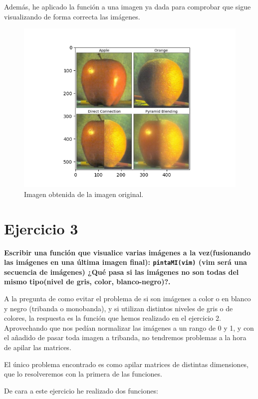 \documentclass[12pt, spanish]{article}
\begin{document}
Además, he aplicado la función a una imagen ya dada para comprobar que sigue visualizando de forma correcta las imágenes.

\begin{figure}[H]
	\centering
	\includegraphics[scale = 0.70]{ej2-orig.png}
	\caption{Imagen obtenida de la imagen original.}
	\label{fig:ej2-tri}
	
\end{figure}

\section{Ejercicio 3}

\textbf{\large Escribir una función que visualice varias imágenes a la vez(fusionando las imágenes en una última imagen final): \texttt{pintaMI(vim)} (vim será una secuencia de imágenes) ¿Qué pasa si las imágenes no son todas del mismo tipo(nivel de gris, color, blanco-negro)?.}

A la pregunta de como evitar el problema de si son imágenes a color o en blanco y negro (tribanda o monobanda), y si utilizan distintos niveles de gris o de colores, la respuesta es la función que hemos realizado en el ejercicio 2. Aprovechando que nos pedían normalizar las imágenes a un rango de 0 y 1, y con el añadido de pasar toda imagen a tribanda, no tendremos problemas a la hora de apilar las matrices.

El único problema encontrado es como apilar matrices de distintas dimensiones, que lo resolveremos con la primera de las funciones.

De cara a este ejercicio he realizado dos funciones:
\end{document}
